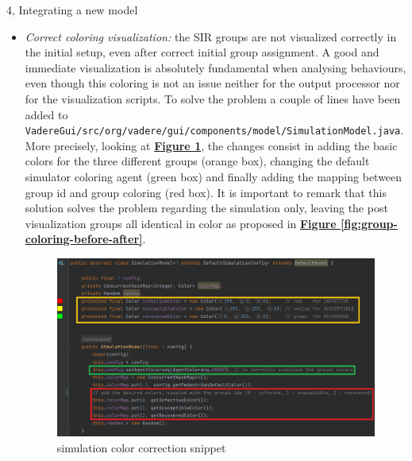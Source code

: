 \documentclass[10pt,a4paper]{article}
\begin{document}
\begin{task}{4, Integrating a new model}
\begin{itemize}
    \item \textit{Correct coloring visualization:} the SIR groups are not visualized correctly in the initial setup, even after correct initial group assignment. A good and immediate visualization is absolutely fundamental when analysing behaviours, even though this coloring is not an issue neither for the output processor nor for the visualization scripts. To solve the problem a couple of lines have been added to \texttt{VadereGui/src/org/vadere/gui/components/model/SimulationModel.java}. More precisely, looking at \textbf{\hyperref[fig:color-snippet]{Figure \ref{fig:color-snippet}}}, the changes consist in adding the basic colors for the three different groups (orange box), changing the default simulator coloring agent (green box) and finally adding the mapping between group id and group coloring (red box). It is important to remark that this solution solves the problem regarding the simulation only, leaving the post visualization groups all identical in color as proposed in \textbf{\hyperref[fig:group-coloring-before-after]{Figure \ref{fig:group-coloring-before-after}}}.
\begin{figure}[H]
    \includegraphics[scale=0.7]{images/simulation_coloring_snippet.png}
    \caption{simulation color correction snippet}
    \label{fig:color-snippet}
\end{figure}


\end{itemize}
\end{task}
\end{document}
